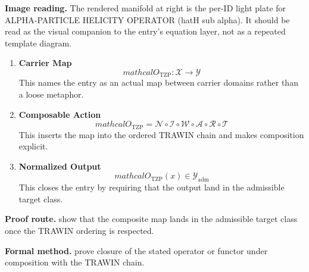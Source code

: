 \begin{samepage}
\noindent\begin{minipage}[t]{0.45\linewidth}
\vspace{0pt}
\raggedright
\scriptsize\textbf{Image reading.} The rendered manifold at right is the per-ID light plate for ALPHA-PARTICLE HELICITY OPERATOR (hatH sub alpha). It should be read as the visual companion to the entry's equation layer, not as a repeated template diagram.\par
\end{minipage}\hfill
\begin{minipage}[t]{0.53\linewidth}
\vspace*{-0.10in}
\raggedright
{}
\end{minipage}
\end{samepage}

\clearpage


\begin{enumerate}[leftmargin=1.6em,itemsep=9pt,topsep=6pt]
\item \textbf{Carrier Map}
\[
mathcal{O}_{\mathrm{TZP}} : \mathcal{X} \to \mathcal{Y}
\]
This names the entry as an actual map between carrier domains rather than a loose metaphor.

\item \textbf{Composable Action}
\[
mathcal{O}_{\mathrm{TZP}} = \mathcal{N}\circ \mathcal{I}\circ \mathcal{W}\circ \mathcal{A}\circ \mathcal{R}\circ \mathcal{T}
\]
This inserts the map into the ordered TRAWIN chain and makes composition explicit.

\item \textbf{Normalized Output}
\[
mathcal{O}_{\mathrm{TZP}}(x) \in \mathcal{Y}_{\mathrm{adm}}
\]
This closes the entry by requiring that the output land in the admissible target class.
\end{enumerate}

\textbf{Proof route.} show that the composite map lands in the admissible target class once the TRAWIN ordering is respected.

\textbf{Formal method.} prove closure of the stated operator or functor under composition with the TRAWIN chain.

\medskip
{}

